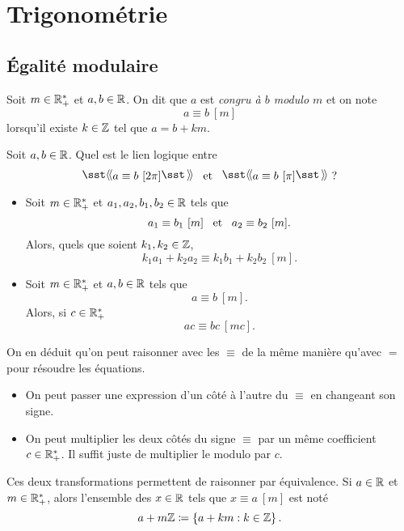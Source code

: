 \documentclass{magnolia}
\begin{document}
\section{Trigonométrie}

\subsection{Égalité modulaire}

\begin{definition}
Soit $m\in\mathbb{R}_+^*$ et $a,b\in\mathbb{R}$. On dit que $a$ est \emph{congru à $b$ modulo $m$} et on note
\[a\equiv b\ [m]\]
lorsqu'il existe $k\in\mathbb{Z}$ tel que $a=b+km$.
\end{definition}

\begin{exoUnique}
\exo Soit $a,b\in\mathbb{R}$. Quel est le lien logique entre
  \[\text{\og}a\equiv b\ [2\pi]\text{\fg} \et \text{\og}a\equiv b\ [\pi]\text{\fg} \text{ ?}\]
\end{exoUnique}

\begin{proposition}
\begin{itemize}
\item 
Soit $m\in\mathbb{R}_+^*$ et $a_1,a_2,b_1,b_2\in\mathbb{R}$ tels que
  \[a_1\equiv b_1\ [m] \et a_2\equiv b_2\ [m].\]
Alors, quels que soient $k_1,k_2\in\mathbb{Z}$,
  \[k_1 a_1+k_2 a_2\equiv k_1 b_1+k_2 b_2\ [m].\]
\item Soit $m\in\mathbb{R}_+^*$ et $a,b\in\mathbb{R}$ tels que
  \[a\equiv b\ [m].\]
  Alors, si $c\in\mathbb{R}_+^*$
  \[ac\equiv bc\ [m c].\]
\end{itemize}
\end{proposition}

\begin{remarques}
\remarque On en déduit qu'on peut raisonner avec les \og $\equiv$ \fg de la même manière qu'avec \og $=$ \fg pour résoudre les équations.
  \begin{itemize}
  \item On peut passer une expression d'un côté à l'autre du \og $\equiv$ \fg en changeant son signe.
  \item On peut multiplier les deux côtés du signe \og $\equiv$ \fg par un même coefficient $c\in\mathbb{R}_+^*$. Il suffit juste de multiplier le modulo par $c$.
  \end{itemize}
  Ces deux transformations permettent de raisonner par équivalence.
\remarque Si $a\in\mathbb{R}$ et $m\in\mathbb{R}_+^*$, alors l'ensemble des $x\in\mathbb{R}$ tels que $x\equiv a\ [m]$ est noté
  \[a+m\mathbb{Z}\coloneqq\left\{a+km : k\in\mathbb{Z}\right\}.\]
\end{remarques}
\end{document}
